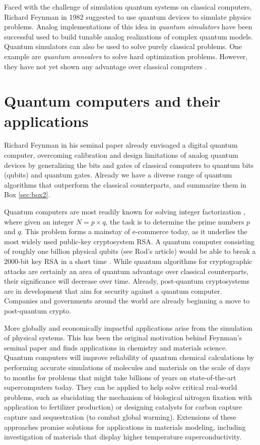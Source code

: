 \documentclass[journal]{IEEEtran}
\begin{document}
Faced with the challenge of simulation quantum systems on classical computers, Richard Feynman in 1982 \cite{Feynman1982} suggested to use quantum devices to simulate physics problems. Analog implementations of this idea in {\em quantum simulators }  \cite{RevModPhys.86.153}  have  been successful used to build tunable analog realizations of complex quantum models. Quantum simulators can also be used to solve purely classical problems. One example are {\em quantum annealers} to solve hard optimization problems. However, they have not  yet shown any advantage over classical computers \cite{speedup}. 

\section{Quantum computers and their applications}

Richard Feynman \cite{Feynman1982} in his seminal paper already envisaged a digital quantum computer, overcoming calibration and design limitations of analog quantum devices by generalizing the bits and gates of classical computers to quantum bits (qubits) and quantum gates. Already we have a diverse range of quantum algorithms that outperform the classical counterparts, and summarize them in Box \ref{sec:box2}.

Quantum computers are most readily known for solving integer factorization \cite{Shor1994}, where given an integer $N=p\times q$, the task is to determine the prime numbers $p$ and $q$.  This problem forms a mainstay of e-commerce today, as it underlies the most widely used public-key cryptosystem RSA.  A quantum computer consisting of roughly one billion physical qubits {\color{red}(see Rod's article)} would be able to break a 2000-bit key RSA in a short time \cite{}.  While quantum algorithms for cryptographic attacks are certainly an area of quantum advantage over classical counterparts, their significance will decrease over time.  Already, post-quantum cryptosystems are in development that aim for security against a quantum computer.  Companies and governments around the world are already beginning a move to post-quantum crypto.  

More globally and economically impactful applications arise from the simulation of physical systems. This has been the original motivation behind Feynman's seminal paper and finds applications in chemistry and materials science. Quantum computers will improve reliability of quantum chemical calculations by performing accurate simulations of molecules and materials on the scale of days to months for problems that might take billions of years on state-of-the-art supercomputers today. They can be applied to help solve critical real-world problems, such as elucidating the mechanism of biological nitrogen fixation with application to fertilizer production) or designing catalysts for carbon capture  capture and sequestration (to combat global warming).  Extensions of these approaches promise solutions for applications in materials modeling, including investigation of materials that display higher temperature superconductivity. 
\end{document}
